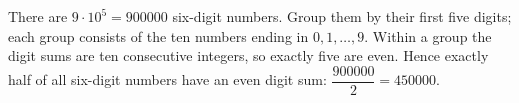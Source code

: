 There are $9\cdot10^5=900000$ six-digit numbers. Group them by their first five digits; each group consists of the ten numbers ending in $0,1,\dots,9$. Within a group the digit sums are ten consecutive integers, so exactly five are even. Hence exactly half of all six-digit numbers have an even digit sum: $\dfrac{900000}{2}=\boxed{450000}$.
